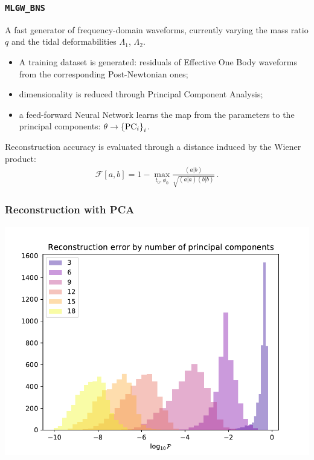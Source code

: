 \documentclass{beamer}
\begin{document}
\begin{frame}
    \frametitle{\texttt{MLGW\_BNS}}
    
    A fast generator of frequency-domain waveforms, currently varying the mass ratio \(q\) and the tidal deformabilities \(\Lambda_1 \), \(\Lambda_2 \).
    
    \begin{itemize}
        \item A training dataset is generated: residuals of Effective One Body waveforms from the corresponding Post-Newtonian ones;
        \item dimensionality is reduced through Principal Component Analysis;
        \item a feed-forward Neural Network learns the map from the parameters to the principal components: \(\theta \to \qty{\text{PC}_i}_i\).
    \end{itemize}
    
    Reconstruction accuracy is evaluated through a distance induced by the Wiener product: 
    \begin{align}
    \mathcal{F}[a, b] = 1 - \max_{t_0 , \phi_0 } \frac{(a|b)}{\sqrt{(a|a)(b|b)}}
    \,.
    \end{align}

\end{frame}

\begin{frame}
    \frametitle{Reconstruction with PCA}
    
    \centering
    \includegraphics[width=.9\textwidth]{figures/reconstruction_errors_PCA.pdf}
\end{frame}
\end{document}
